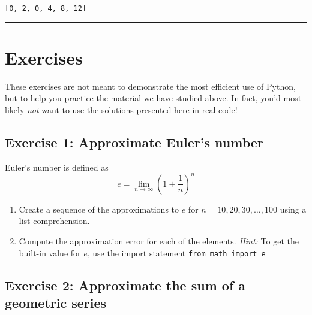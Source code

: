 \documentclass[10pt]{scrartcl}
\makeatletter
\providecommand{\tightlist}{%
      \setlength{\itemsep}{0pt}\setlength{\parskip}{0pt}}
\newcommand{\boxspacing}{\kern\kvtcb@left@rule\kern\kvtcb@boxsep}
\newcommand{\prompt}[4]{
        {\ttfamily\llap{{\color{#2}[#3]:\hspace{3pt}#4}}\vspace{-\baselineskip}}
    }
\makeatother
\begin{document}
            \begin{tcolorbox}[breakable, size=fbox, boxrule=.5pt, pad at break*=1mm, opacityfill=0]
\prompt{Out}{outcolor}{30}{\boxspacing}
\begin{Verbatim}[commandchars=\\\{\}]
[0, 2, 0, 4, 8, 12]
\end{Verbatim}
\end{tcolorbox}
        
    \begin{center}\rule{0.5\linewidth}{0.5pt}\end{center}

\hypertarget{exercises}{%
\section{Exercises}\label{exercises}}

These exercises are not meant to demonstrate the most efficient use of
Python, but to help you practice the material we have studied above. In
fact, you'd most likely \emph{not} want to use the solutions presented
here in real code!

    \hypertarget{exercise-1-approximate-eulers-number}{%
\subsection{Exercise 1: Approximate Euler's
number}\label{exercise-1-approximate-eulers-number}}

Euler's number is defined as
\[e = \lim_{n\to\infty} \left(1+\frac{1}{n}\right)^n\]

\begin{enumerate}
\def\labelenumi{\arabic{enumi}.}
\tightlist
\item
  Create a sequence of the approximations to \(e\) for
  \(n=10,20,30,\dots,100\) using a list comprehension.
\item
  Compute the approximation error for each of the elements. \emph{Hint:}
  To get the built-in value for \(e\), use the import statement
  \texttt{from\ math\ import\ e}
\end{enumerate}

    \hypertarget{exercise-2-approximate-the-sum-of-a-geometric-series}{%
\subsection{Exercise 2: Approximate the sum of a geometric
series}\label{exercise-2-approximate-the-sum-of-a-geometric-series}}
\end{document}
